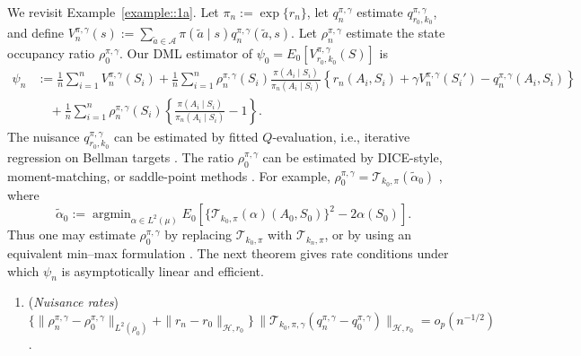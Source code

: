 \documentclass[12pt]{article}
\DeclareMathOperator*{\argmin}{argmin}
\theoremstyle{plain}
\begin{document}
We revisit Example~\ref{example::1a}. Let \(\pi_n:=\exp\{r_n\}\), let
\(q_n^{\pi,\gamma}\) estimate \(q_{r_0,k_0}^{\pi,\gamma}\), and define
\(V_n^{\pi,\gamma}(s):=\sum_{\tilde a\in\mathcal A}\pi(\tilde a\mid s)
q_n^{\pi,\gamma}(\tilde a,s)\). Let \(\rho_n^{\pi,\gamma}\) estimate the state
occupancy ratio \(\rho_0^{\pi,\gamma}\). Our DML estimator of
\(\psi_0=E_0[V_{r_0,k_0}^{\pi,\gamma}(S)]\) is
\begin{align*}
\psi_n
&:= \frac{1}{n}\sum_{i=1}^n V_n^{\pi,\gamma}(S_i)
  + \frac{1}{n}\sum_{i=1}^n
  \rho_n^{\pi,\gamma}(S_i)
  \frac{\pi(A_i\mid S_i)}{\pi_n(A_i\mid S_i)}
  \left\{
  r_n(A_i,S_i)+\gamma V_n^{\pi,\gamma}(S_i')
  -q_n^{\pi,\gamma}(A_i,S_i)
  \right\} \\
&\quad
  + \frac{1}{n}\sum_{i=1}^n
  \rho_n^{\pi,\gamma}(S_i)
  \left\{
  \frac{\pi(A_i\mid S_i)}{\pi_n(A_i\mid S_i)}-1
  \right\}.
\end{align*}
The nuisance \(q_{r_0,k_0}^{\pi,\gamma}\) can be estimated by fitted
\(Q\)-evaluation, i.e., iterative regression on Bellman targets
\citep{ernst2005tree,munos2005error,riedmiller2005neural,munos2008finite,mnih2013playing,van2025fitted}.
The ratio \(\rho_0^{\pi,\gamma}\) can be estimated by DICE-style,
moment-matching, or saddle-point methods
\citep{liu2018breaking,uehara2020minimax,nachum2019dualdice,zhang2020gendice,wang2023projected,van2025automaticDRL}.
For example, \(\rho_0^{\pi,\gamma}=\mathcal T_{k_0,\pi}(\widetilde\alpha_0)\)
\citep{van2025automaticDRL}, where
\[
\widetilde\alpha_0
:=
\argmin_{\alpha\in L^2(\mu)}
E_0\!\left[
\{\mathcal T_{k_0,\pi}(\alpha)(A_0,S_0)\}^2
-2\alpha(S_0)
\right].
\]
Thus one may estimate \(\rho_0^{\pi,\gamma}\) by replacing
\(\mathcal T_{k_0,\pi}\) with \(\mathcal T_{k_n,\pi}\), or by using an
equivalent min--max formulation
\citep{liu2018breaking,uehara2020minimax,dikkala2020minimax,kallus2020double}.
The next theorem gives rate conditions under which \(\psi_n\) is asymptotically
linear and efficient.

\begin{enumerate}[label=\textbf{(E\arabic*)}, ref=E\arabic*, series = efficiency1a]
  
    
    \item \label{assump:rates::policy} (\textit{Nuisance rates}) 
    $\bigl\{\|\rho_n^{\pi,\gamma} - \rho_0^{\pi,\gamma}\|_{L^2(\rho_0)} 
      + \|r_n - r_0\|_{\mathcal{H},r_0}\bigr\}\,
    \bigl\|
        \mathcal{T}_{k_0,\pi,\gamma}(q_n^{\pi,\gamma} - q_0^{\pi,\gamma})
    \bigr\|_{\mathcal{H},r_0}
    = o_p(n^{-1/2})$.
\end{enumerate}
\end{document}

